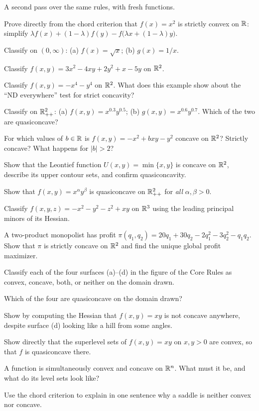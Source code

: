 A second pass over the same rules, with fresh functions.

\begin{problems}
  \item Prove directly from the chord criterion that $f(x)=x^{2}$ is
        strictly convex on $\mathbb{R}$: simplify
        $\lambda f(x)+(1-\lambda)f(y)-f\bigl(\lambda x+(1-\lambda)y\bigr)$.
  \item Classify on $(0,\infty)$: (a) $f(x)=\sqrt{x}$; (b) $g(x)=1/x$.
  \item Classify $f(x,y)=3x^{2}-4xy+2y^{2}+x-5y$ on $\mathbb{R}^{2}$.
  \item Classify $f(x,y)=-x^{4}-y^{4}$ on $\mathbb{R}^{2}$. What does this example
        show about the ``ND everywhere'' test for strict concavity?
  \item Classify on $\mathbb{R}^{2}_{++}$: (a) $f(x,y)=x^{0.3}y^{0.5}$;
        (b) $g(x,y)=x^{0.6}y^{0.7}$. Which of the two are quasiconcave?
  \item For which values of $b\in\mathbb{R}$ is $f(x,y)=-x^{2}+bxy-y^{2}$ concave
        on $\mathbb{R}^{2}$? Strictly concave? What happens for $|b|>2$?
  \item Show that the Leontief function $U(x,y)=\min\{x,y\}$ is concave on
        $\mathbb{R}^{2}$, describe its upper contour sets, and confirm
        quasiconcavity.
  \item Show that $f(x,y)=x^{\alpha}y^{\beta}$ is quasiconcave on
        $\mathbb{R}^{2}_{++}$ for \emph{all} $\alpha,\beta>0$.
  \item Classify $f(x,y,z)=-x^{2}-y^{2}-z^{2}+xy$ on $\mathbb{R}^{3}$ using the
        leading principal minors of its Hessian.
  \item A two-product monopolist has profit
        $\pi(q_1,q_2)=20q_1+30q_2-2q_1^{2}-3q_2^{2}-q_1q_2$. Show that
        $\pi$ is strictly concave on $\mathbb{R}^{2}$ and find the unique global
        profit maximizer.

  \item Classify each of the four surfaces (a)--(d) in the figure of the
        Core Rules as convex, concave, both, or neither on the domain
        drawn.
  \item Which of the four are quasiconcave on the domain drawn?
  \item Show by computing the Hessian that $f(x,y)=xy$ is not concave
        anywhere, despite surface (d) looking like a hill from some angles.
  \item Show directly that the superlevel sets of $f(x,y)=xy$ on
        $x,y>0$ are convex, so that $f$ is quasiconcave there.
  \item A function is simultaneously convex and concave on $\mathbb{R}^{n}$. What
        must it be, and what do its level sets look like?
  \item Use the chord criterion to explain in one sentence why a saddle is
        neither convex nor concave.


\end{problems}
